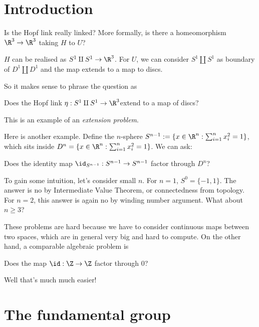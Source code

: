 \documentclass[a4paper]{article}
\begin{document}


\tableofcontents

\setcounter{section}{-1}

\section{Introduction}

\begin{question}
  Is the Hopf link really linked? More formally, is there a homeomorphism \(\R^3 \to \R^3\) taking \(H\) to \(U\)?
\end{question}

\(H\) can be realised as \(S^1 \amalg S^1 \to \R^3\). For \(U\), we can consider \(S^1 \amalg S^1\) as boundary of \(D^1 \amalg D^1\) and the map extends to a map to discs.

So it makes sense to phrase the question as

\begin{question}
  Does the Hopf link \(\eta: S^1 \amalg S^1 \to \R^3\)extend to a map of discs?
\end{question}

This is an example of an \emph{extension problem}.

Here is another example. Define the \(n\)-sphere \(S^{n - 1} := \{x \in \R^n: \sum_{i = 1}^n x_i^2 = 1\}\), which sits inside \(D^n = \{x \in \R^n: \sum_{i = 1}^n x_i^2 = 1\}\). We can ask:

\begin{question}
  Does the identity map \(\id_{S^{n - 1}}: S^{n - 1} \to S^{n - 1}\) factor through \(D^n\)?
\end{question}

To gain some intuition, let's consider small \(n\). For \(n = 1\), \(S^0 = \{-1, 1\}\). The answer is no by Intermediate Value Theorem, or connectedness from topology. For \(n = 2\), this answer is again no by winding number argument. What about \(n \geq 3\)?

These problems are hard because we have to consider continuous maps between two spaces, which are in general very big and hard to compute. On the other hand, a comparable algebraic problem is

\begin{question}
  Does the map \(\id: \Z \to \Z\) factor through \(0\)?
\end{question}

Well that's much much easier!

\section{The fundamental group}
\end{document}
